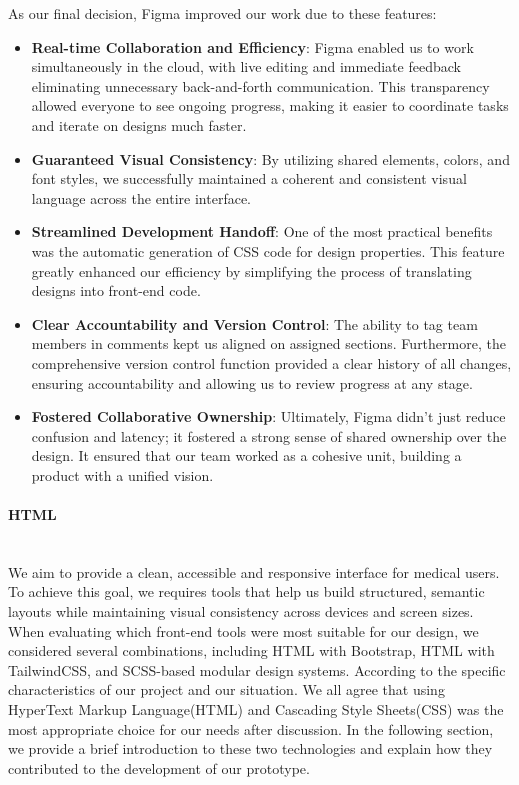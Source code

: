 As our final decision, Figma improved our work due to these features:
\begin{itemize}
    \item \textbf{Real-time Collaboration and Efficiency}: Figma enabled us to work simultaneously in the cloud, with live editing and immediate feedback eliminating unnecessary back-and-forth communication. This transparency allowed everyone to see ongoing progress, making it easier to coordinate tasks and iterate on designs much faster.
    \item \textbf{Guaranteed Visual Consistency}: By utilizing shared elements, colors, and font styles, we successfully maintained a coherent and consistent visual language across the entire interface.
    \item \textbf{Streamlined Development Handoff}: One of the most practical benefits was the automatic generation of CSS code for design properties. This feature greatly enhanced our efficiency by simplifying the process of translating designs into front-end code.
    \item \textbf{Clear Accountability and Version Control}: The ability to tag team members in comments kept us aligned on assigned sections. Furthermore, the comprehensive version control function provided a clear history of all changes, ensuring accountability and allowing us to review progress at any stage.
    \item \textbf{Fostered Collaborative Ownership}: Ultimately, Figma didn't just reduce confusion and latency; it fostered a strong sense of shared ownership over the design. It ensured that our team worked as a cohesive unit, building a product with a unified vision.
\end{itemize}

\paragraph{HTML}\mbox{}\\
We aim to provide a clean, accessible and responsive interface for medical users. To achieve this goal, we requires tools that help us build structured, semantic layouts while maintaining visual consistency across devices and screen sizes. When evaluating which front-end tools were most suitable for our design, we considered several combinations, including HTML with Bootstrap, HTML with TailwindCSS, and SCSS-based modular design systems. According to the specific characteristics of our project and our situation. We all agree that using HyperText Markup Language(HTML) and Cascading Style Sheets(CSS) was the most appropriate choice for our needs after discussion. In the following section, we provide a brief introduction to these two technologies and explain how they contributed to the development of our prototype.


